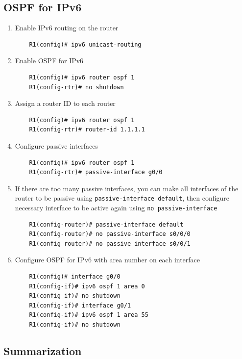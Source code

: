 \subsection{OSPF for IPv6}

\begin{enumerate}
\item Enable IPv6 routing on the router
	\begin{verbatim}
	R1(config)# ipv6 unicast-routing 
	\end{verbatim}
	
\item Enable OSPF for IPv6
	\begin{verbatim}
	R1(config)# ipv6 router ospf 1 
	R1(config-rtr)# no shutdown 
	\end{verbatim}	
	
\item Assign a router ID to each router
	\begin{verbatim}
	R1(config)# ipv6 router ospf 1 
	R1(config-rtr)# router-id 1.1.1.1
	\end{verbatim}

\item Configure passive interfaces
	\begin{verbatim}
	R1(config)# ipv6 router ospf 1 
	R1(config-rtr)# passive-interface g0/0 
	\end{verbatim}
	
\item If there are too many passive interfaces, you can make all interfaces of the router to be passive using \verb|passive-interface default|, then configure necessary interface to be active again using \verb|no passive-interface|
	\begin{verbatim}
	R1(config-router)# passive-interface default
	R1(config-router)# no passive-interface s0/0/0
	R1(config-router)# no passive-interface s0/0/1
	\end{verbatim}	
	
\item Configure OSPF for IPv6 with area number on each interface
	\begin{verbatim}
	R1(config)# interface g0/0 
	R1(config-if)# ipv6 ospf 1 area 0
	R1(config-if)# no shutdown
	R1(config-if)# interface g0/1       
	R1(config-if)# ipv6 ospf 1 area 55
	R1(config-if)# no shutdown
	\end{verbatim}     
	
\end{enumerate}	

\subsection{Summarization}

